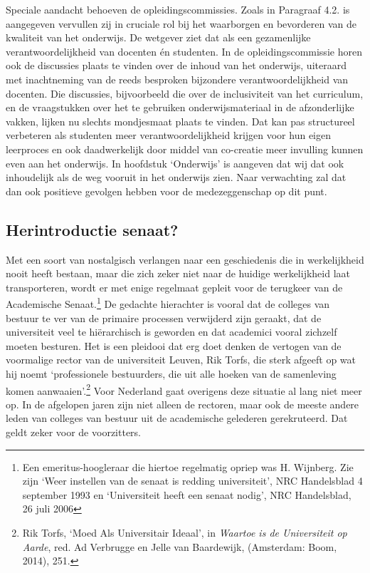 \documentclass[smallauthor, chapterhaspagenum, nochapterinheader, pagenuminheader,  bigchapnum,medium2, tocpages,  garamond, titleinheader]{jote-book}
\begin{document}
	Speciale aandacht behoeven de opleidingscommissies. Zoals in Paragraaf 4.2. is aangegeven vervullen zij in cruciale rol bij het waarborgen en bevorderen van de kwaliteit van het onderwijs. De wetgever ziet dat als een gezamenlijke verantwoordelijkheid van docenten én studenten. In de opleidingscommissie horen ook de discussies plaats te vinden over de inhoud van het onderwijs, uiteraard met inachtneming van de reeds besproken bijzondere verantwoordelijkheid van docenten. Die discussies, bijvoorbeeld die over de inclusiviteit van het curriculum, en de vraagstukken over het te gebruiken onderwijsmateriaal in de afzonderlijke vakken, lijken nu slechts mondjesmaat plaats te vinden. Dat kan pas structureel verbeteren als studenten meer verantwoordelijkheid krijgen voor hun eigen leerproces en ook daadwerkelijk door middel van co-creatie meer invulling kunnen even aan het onderwijs. In hoofdstuk ‘Onderwijs' is aangeven dat wij dat ook inhoudelijk als de weg vooruit in het onderwijs zien. Naar verwachting zal dat dan ook positieve gevolgen hebben voor de medezeggenschap op dit punt.



	\subsection{Herintroductie senaat?}



	Met een soort van nostalgisch verlangen naar een geschiedenis die in werkelijkheid nooit heeft bestaan, maar die zich zeker niet naar de huidige werkelijkheid laat transporteren, wordt er met enige regelmaat gepleit voor de terugkeer van de Academische Senaat.\footnote{Een emeritus-hoogleraar die hiertoe regelmatig opriep was H. Wijnberg. Zie zijn ‘Weer instellen van de senaat is redding universiteit', NRC Handelsblad 4 september 1993 en ‘Universiteit heeft een senaat nodig', NRC Handelsblad, 26 juli 2006} De gedachte hierachter is vooral dat de colleges van bestuur te ver van de primaire processen verwijderd zijn geraakt, dat de universiteit veel te hiërarchisch is geworden en dat academici vooral zichzelf moeten besturen. Het is een pleidooi dat erg doet denken de vertogen van de voormalige rector van de universiteit Leuven, Rik Torfs, die sterk afgeeft op wat hij noemt ‘professionele bestuurders, die uit alle hoeken van de samenleving komen aanwaaien'.\footnote{Rik Torfs, ‘Moed Als Universitair Ideaal', in \emph{Waartoe is de Universiteit op Aarde}, red. Ad Verbrugge en Jelle van Baardewijk, (Amsterdam: Boom, 2014), 251. } Voor Nederland gaat overigens deze situatie al lang niet meer op. In de afgelopen jaren zijn niet alleen de rectoren, maar ook de meeste andere leden van colleges van bestuur uit de academische gelederen gerekruteerd. Dat geldt zeker voor de voorzitters.
\end{document}
